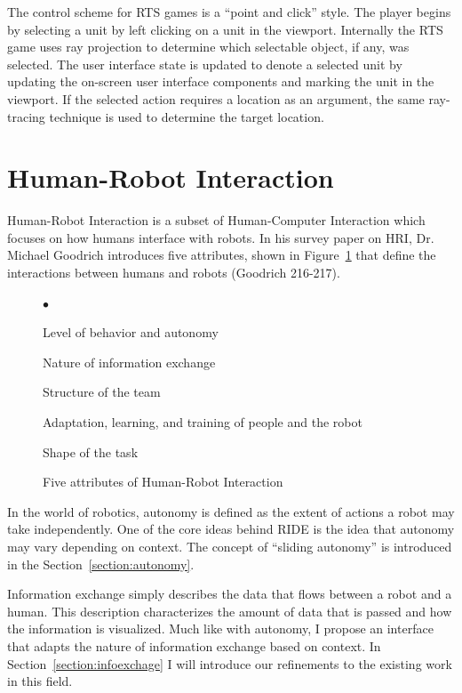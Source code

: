 The control scheme for RTS games is a ``point and click'' style. The player begins by selecting a unit by left clicking on a unit in the viewport. Internally the RTS game uses ray projection to determine which selectable object, if any, was selected. The user interface state is updated to denote a selected unit by updating the on-screen user interface components and marking the unit in the viewport. If the selected action requires a location as an argument, the same ray-tracing technique is used to determine the target location.



\section{Human-Robot Interaction}
Human-Robot Interaction is a subset of Human-Computer Interaction which focuses on how humans interface with robots. In his survey paper on HRI, Dr. Michael Goodrich introduces five attributes, shown in Figure~\ref{fig:five-attributes} that define the interactions between humans and robots (Goodrich 216-217).

\begin{figure}[ht]
	\makebox[\textwidth]{\hrulefill}
	\begin{list}{$\bullet$}
		\item Level of behavior and autonomy
		\item Nature of information exchange
		\item Structure of the team
		\item Adaptation, learning, and training of people and the robot
		\item Shape of the task
	\end{list}
	\makebox[\textwidth]{\hrulefill}
	\caption{Five attributes of Human-Robot Interaction \label{fig:five-attributes}}
\end{figure}

In the world of robotics, autonomy is defined as the extent of actions a robot may take independently. One of the core ideas behind RIDE is the idea that autonomy may vary depending on context. The concept of ``sliding autonomy'' is introduced in the Section~\ref{section:autonomy}.

Information exchange simply describes the data that flows between a robot and a human. This description characterizes the amount of data that is passed and how the information is visualized. Much like with autonomy, I propose an interface that adapts the nature of information exchange based on context. In Section~\ref{section:infoexchage} I will introduce our refinements to the existing work in this field.

